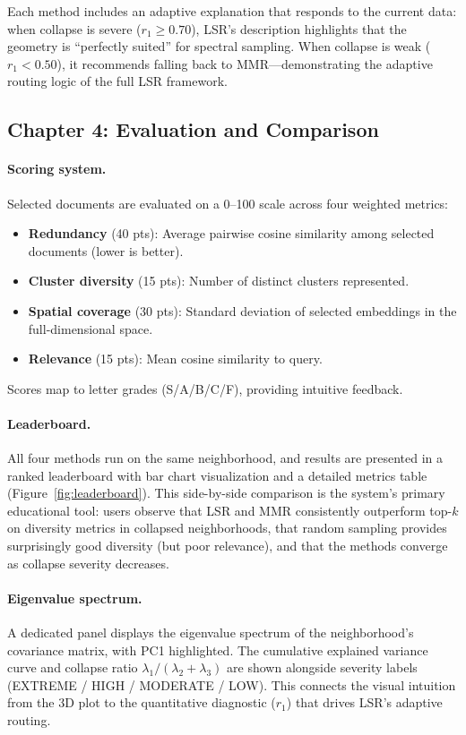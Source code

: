 \documentclass[11pt]{article}
\begin{document}
Each method includes an adaptive explanation that responds to the current data: when collapse is severe ($r_1 \geq 0.70$), LSR's description highlights that the geometry is ``perfectly suited'' for spectral sampling. When collapse is weak ($r_1 < 0.50$), it recommends falling back to MMR---demonstrating the adaptive routing logic of the full LSR framework.

\subsection{Chapter 4: Evaluation and Comparison}

\paragraph{Scoring system.} Selected documents are evaluated on a 0--100 scale across four weighted metrics:

\begin{itemize}
    \item \textbf{Redundancy} (40 pts): Average pairwise cosine similarity among selected documents (lower is better).
    \item \textbf{Cluster diversity} (15 pts): Number of distinct clusters represented.
    \item \textbf{Spatial coverage} (30 pts): Standard deviation of selected embeddings in the full-dimensional space.
    \item \textbf{Relevance} (15 pts): Mean cosine similarity to query.
\end{itemize}

Scores map to letter grades (S/A/B/C/F), providing intuitive feedback.

\paragraph{Leaderboard.} All four methods run on the same neighborhood, and results are presented in a ranked leaderboard with bar chart visualization and a detailed metrics table (Figure~\ref{fig:leaderboard}). This side-by-side comparison is the system's primary educational tool: users observe that LSR and MMR consistently outperform top-$k$ on diversity metrics in collapsed neighborhoods, that random sampling provides surprisingly good diversity (but poor relevance), and that the methods converge as collapse severity decreases.

\paragraph{Eigenvalue spectrum.} A dedicated panel displays the eigenvalue spectrum of the neighborhood's covariance matrix, with PC1 highlighted. The cumulative explained variance curve and collapse ratio $\lambda_1 / (\lambda_2 + \lambda_3)$ are shown alongside severity labels (EXTREME / HIGH / MODERATE / LOW). This connects the visual intuition from the 3D plot to the quantitative diagnostic ($r_1$) that drives LSR's adaptive routing.
\end{document}
